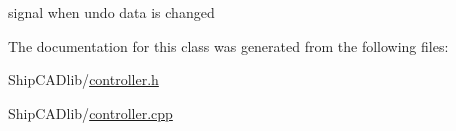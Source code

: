signal when undo data is changed 



The documentation for this class was generated from the following files\-:\begin{DoxyCompactItemize}
\item 
Ship\-C\-A\-Dlib/\hyperlink{controller_8h}{controller.\-h}\item 
Ship\-C\-A\-Dlib/\hyperlink{controller_8cpp}{controller.\-cpp}\end{DoxyCompactItemize}
